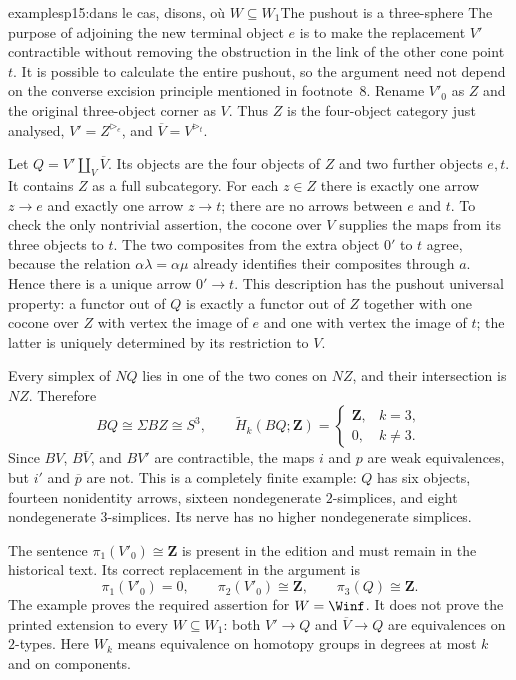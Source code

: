 \begin{dcomment}{examples}{p15:dans le cas, disons, où $W \subseteq W_1$}{The pushout is a three-sphere}
The purpose of adjoining the new terminal object $e$ is to make the replacement $V'$ contractible without removing the obstruction in the link of the other cone point $t$. It is possible to calculate the entire pushout, so the argument need not depend on the converse excision principle mentioned in footnote~8. Rename $V'_0$ as $Z$ and the original three-object corner as $V$. Thus $Z$ is the four-object category just analysed, $V'=Z^{\triangleright_e}$, and $\overline V=V^{\triangleright_t}$.

Let $Q=V'\amalg_V\overline V$. Its objects are the four objects of $Z$ and two further objects $e,t$. It contains $Z$ as a full subcategory. For each $z\in Z$ there is exactly one arrow $z\to e$ and exactly one arrow $z\to t$; there are no arrows between $e$ and $t$. To check the only nontrivial assertion, the cocone over $V$ supplies the maps from its three objects to $t$. The two composites from the extra object $0'$ to $t$ agree, because the relation $\alpha\lambda=\alpha\mu$ already identifies their composites through $a$. Hence there is a unique arrow $0'\to t$. This description has the pushout universal property: a functor out of $Q$ is exactly a functor out of $Z$ together with one cocone over $Z$ with vertex the image of $e$ and one with vertex the image of $t$; the latter is uniquely determined by its restriction to $V$.

Every simplex of $NQ$ lies in one of the two cones on $NZ$, and their intersection is $NZ$. Therefore
\[
 BQ\cong\Sigma BZ\cong S^3,
 \qquad \widetilde H_k(BQ;\mathbf Z)=
 \begin{cases}\mathbf Z,&k=3,\\0,&k\ne3.\end{cases}
\]
Since $BV$, $B\overline V$, and $BV'$ are contractible, the maps $i$ and $p$ are weak equivalences, but $i'$ and $\overline p$ are not. This is a completely finite example: $Q$ has six objects, fourteen nonidentity arrows, sixteen nondegenerate $2$-simplices, and eight nondegenerate $3$-simplices. Its nerve has no higher nondegenerate simplices.

The sentence $\pi_1(V'_0)\cong\mathbf Z$ is present in the edition and must remain in the historical text. Its correct replacement in the argument is
\[
 \pi_1(V'_0)=0,\qquad \pi_2(V'_0)\cong\mathbf Z,
 \qquad \pi_3(Q)\cong\mathbf Z.
\]
The example proves the required assertion for $W=\Winf$. It does not prove the printed extension to every $W\subseteq W_1$: both $V'\to Q$ and $\overline V\to Q$ are equivalences on $2$-types. Here $W_k$ means equivalence on homotopy groups in degrees at most $k$ and on components.


\end{dcomment}
